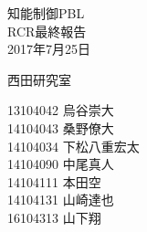 \begin{titlepage}

  \vspace*{25mm}

  \begin{center}
    {\huge 知能制御PBL\\}
    \vspace{5mm}
    {\Huge RCR最終報告\\}
    \vspace{20mm}
    {\Large 2017年7月25日}

    \vspace{25mm}

    {\LARGE 西田研究室\\}

    \vspace{10mm}

    {\Large
   13104042 烏谷崇大　　\\
   14104043 桑野僚大　　\\
   14104034 下松八重宏太\\
   14104090 中尾真人　　\\
   14104111 本田空　　　\\
   14104131 山崎達也　　\\
   16104313 山下翔　　　\\
}

  \end{center}

\end{titlepage}
